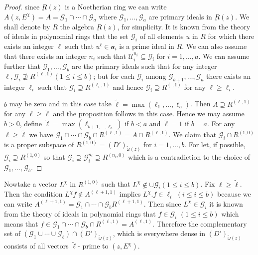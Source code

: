 \begin{proof}
  since $\underbar{R}(z)$ is a Noetherian ring we can write $A (z,
  E^\chi)= A =\mathscr{G}_1 \cap \cdots \cap \mathscr{G}_a $ where
  $\mathscr{G}_1, \ldots , \mathscr{G}_a$ are primary ideals in
  $\underbar{R}(z)$. We shall denote by $R$ the algebra
  $\underbar{R}(z)$, for simplicity. It is known from the theory of
  ideals in polynomial rings that the set $\mathscr{G}_i$ of all
  elements $u$ in $R$ for which there exists an integer $\ell$ such
  that $u^\ell \in \mathscr{u}_i$ is a prime ideal in $R$. We can also
  assume that there exists an integer $n_i$ such that
  $\mathscr{U}^{n_i}_i \subseteq \mathscr{G}_i$ for $i=1, \ldots,
  a$. We can assume further that $\mathscr{G}_1,\ldots, \mathscr{G}_b
  $ are the primary ideals such that for any integer $\ell,
  \mathscr{G}_i \nsupseteq R^{(\ell, 1)}(1 \leq i \leq b)$; but for
  each $\mathscr{G}_i$ among $\mathscr{G}_{b + 1}, \ldots,
  \mathscr{G}_a$ there exists an integer $\ell_i$ such that
  $\mathscr{G}_i \supseteq R^{(\ell_i, 1)}$ and hence $\mathscr{G}_i
  \supseteq R^{(~,1)}$ for any $\ell \geq \ell_i$. 

  $b$ may be zero and in this case take $\tilde{\ell}= \max (\ell_1,
  \ldots, \ell_a)$. Then $A \supseteq R^{(\ell, 1)}$ for any $\ell
  \geq \tilde{\ell}$ and the proposition follows in this case. Hence
  we may assume $b >0 $, define $\tilde{\ell}= \max (\ell_{b+1,
    \ldots, \ell_a})$ if $b < a $ and $\tilde{\ell}=1$ if $b=a$. For
  any $\ell \geq \tilde{\ell}$ we have $\mathscr{G}_1 \cap \cdots \cap
  \mathscr{G}_b \cap R^{(\ell,1)}= A \cap R^{(\ell, 1)}$. We claim
  that $\mathscr{G}_i \cap R^{(1, 0)}$ is a proper subspace of $R^{(1,
    0)}= (D')_{\tilde{\omega}(z)}$ for $i =1, \ldots, b$. For let, if
  possible, $\mathscr{G}_i \supseteq R^{(1, 0)}$ so that
  $\mathscr{G}_i \supseteq \mathscr{G}_i ^{n_i} \supseteq R^{(n_i,
    0)}$ which is a contradiction to the choice of $\mathscr{G}_1,
  \ldots , \mathscr{G}_b$. 
\end{proof} 

Now\pageoriginale take a vector $L^\chi$ in $R^{(1, 0)}$ such that $L^\chi \notin
\cup \mathscr{G}_i (1 \leq i \leq b)$. Fix $\ell \geq
\tilde{\ell}$. Then the condition $L^\chi f \notin A^{(\ell+1, 1)}$
implies $L^\chi. f \in \ell_i$ $(i \leq i \leq b)$ because we can write
$A^{(\ell +1, 1)}= \mathscr{G}_1 \cap \cdots \cap \mathscr{G}_b
R^{(\ell +1, 1)}$. Then since $L^\chi \in \mathscr{G}_i$ it is known
from the theory of ideals in polynomial rings that $f \in
\mathscr{G}_i$ $(1 \leq i \leq b)$ which means that $f \in \mathscr{G}_1
\cap \cdots \cap \mathscr{G}_b \cap R^{(\ell, 1 )} =A^{(\ell,
  1)}$. Therefore the complementary set of $(\mathscr{G}_1 \cup \cdots
\cup\mathscr{G}_b  ) \cap (D')_{\tilde{\omega}(z)}$, which is
everywhere dense in $(D')_{\tilde{\omega}(z)}$ consists of all vectors
$\tilde{\ell}$- prime to $(z, E^\chi)$. 

